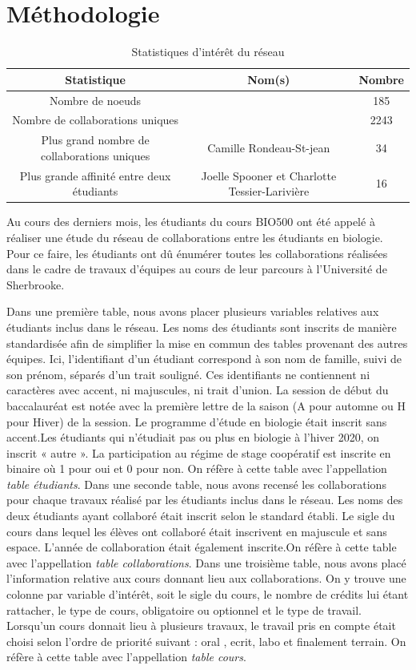 \documentclass[letterpaper,twocolumn,showkeys, 12pt]{article}
\begin{document}
\section*{Méthodologie}

\begin{table}[h]
\centering
\caption{Statistiques d'intérêt du réseau}
\label{my-label}
\begin{tabular}{c c c}
Statistique & Nom(s) & Nombre   \\
\hline
Nombre de noeuds & & 185\\
Nombre de collaborations uniques & & 2243\\
Plus grand nombre de collaborations uniques & Camille Rondeau-St-jean & 34  \\
Plus grande affinité entre deux étudiants & Joelle Spooner et Charlotte Tessier-Larivière & 16  \\
\hline
\end{tabular}
\end{table}

Au cours des derniers mois, les étudiants du cours BIO500 ont été appelé à réaliser une étude du réseau de collaborations entre les étudiants en biologie. Pour ce faire, les étudiants ont dû énumérer toutes les collaborations réalisées dans le cadre de travaux d’équipes au cours de leur parcours à l’Université de Sherbrooke. 

Dans une première table, nous avons placer plusieurs variables relatives aux étudiants inclus dans le réseau. Les noms des étudiants sont inscrits de manière standardisée afin de simplifier la mise en commun des tables provenant des autres équipes. Ici, l'identifiant d'un étudiant correspond à son nom de famille, suivi de son prénom, séparés d'un trait souligné. Ces identifiants ne contiennent ni caractères avec accent, ni majuscules, ni trait d'union. La session de début du baccalauréat est notée avec la première lettre de la saison (A pour automne ou H pour Hiver) de la session. Le programme d’étude en biologie était inscrit sans accent.Les étudiants qui n’étudiait pas ou plus en biologie à l'hiver 2020, on inscrit « autre ». La participation au régime de stage coopératif est inscrite en binaire où 1  pour oui et 0 pour non. On réfère à cette table avec l'appellation \textit{table étudiants}. Dans une seconde table, nous avons recensé les collaborations pour chaque travaux réalisé par les étudiants inclus dans le réseau. Les noms des deux étudiants ayant collaboré était inscrit selon le standard établi. Le sigle du cours dans lequel les élèves ont collaboré était inscrivent en majuscule et sans espace. L’année de collaboration était également inscrite.On réfère à cette table avec l'appellation \textit{table collaborations}. Dans une troisième table, nous avons placé l'information relative aux cours donnant lieu aux collaborations. On y trouve une colonne par variable d'intérêt, soit le sigle du cours, le nombre de crédits lui étant rattacher, le type de cours, obligatoire ou optionnel et le type de travail. Lorsqu'un cours donnait lieu à plusieurs travaux, le travail pris en compte était choisi selon l’ordre de priorité suivant : oral , ecrit, labo et finalement terrain. On réfère à cette table avec l'appellation \textit{table cours}.
\end{document}
